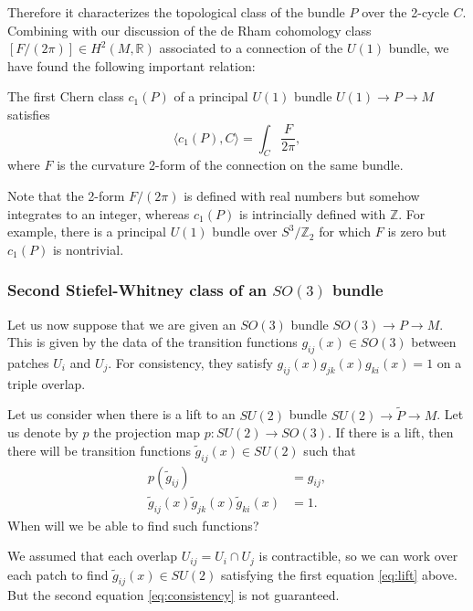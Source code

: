 \documentclass[12pt]{article}
\numberwithin{equation}{section}
\numberwithin{figure}{section}
\theoremstyle{remark}
\def\bR{\mathbb{R}}
\def\bZ{\mathbb{Z}}
\begin{document}
Therefore it characterizes the topological class of the bundle $P$ over the 2-cycle $C$.
Combining with our discussion of the de Rham cohomology class $[F/(2\pi)]\in H^2(M,\bR)$ associated to a connection of the $U(1)$ bundle, 
we have found the following important relation:
\begin{proposition}
  The first Chern class $c_1(P)$ of a principal $U(1)$ bundle $U(1)\to P\to M$ 
  satisfies 
  \begin{equation}
    \langle c_1(P),C\rangle = \int_C \frac{F}{2\pi},
  \end{equation}
  where $F$ is the curvature 2-form of the connection on the same bundle.
\end{proposition}

Note that the 2-form $F/(2\pi)$ is defined with real numbers but somehow integrates to an integer,
whereas $c_1(P)$ is intrincially defined with $\bZ$.
For example, there is a principal $U(1)$ bundle over $S^3/\bZ_2$
for which $F$ is zero but $c_1(P)$ is nontrivial.

\subsubsection{Second Stiefel-Whitney class of an $SO(3)$ bundle}

Let us now suppose that we are given an $SO(3)$ bundle $SO(3)\to P\to M$.
This is given by the data of the transition functions $g_{ij}(x)\in SO(3)$
between patches $U_i$ and $U_j$.
For consistency, they satisfy $g_{ij}(x)g_{jk}(x)g_{ki}(x)=1$ on a triple overlap.

Let us consider when there is a lift to an $SU(2)$ bundle $SU(2)\to \tilde P\to M$.
Let us denote by $p$ the projection map $p:SU(2)\to SO(3)$.
If there is a lift, then there will be transition functions $\tilde g_{ij}(x)\in SU(2)$ such that \begin{align}
  p(\tilde g_{ij}) &= g_{ij}, \label{eq:lift}\\
  \tilde g_{ij}(x)\tilde g_{jk}(x)\tilde g_{ki}(x) &= 1.\label{eq:consistency}
\end{align}
When will we be able to find such functions?

We assumed that each overlap $U_{ij}=U_i\cap U_j$ is contractible, 
so we can work over each patch to find $\tilde g_{ij}(x)\in SU(2)$ satisfying 
the first equation \eqref{eq:lift} above.
But the second equation \eqref{eq:consistency} is not guaranteed. 
\end{document}
